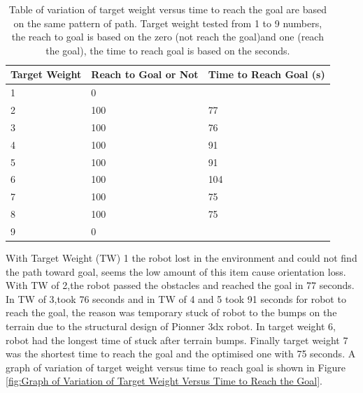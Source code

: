 \begin{table}[ht!]
\centering
    \begin{tabular}{ m{3cm} m{5cm} m{5cm} } 
    \toprule
    \toprule
    \textbf{Target Weight} & \textbf{Reach to Goal or Not} & \textbf{Time to Reach Goal (s)} \\
    \midrule
    1      & 0       &    \\[1.3ex]
    2       & 100    & 77   \\[1.3ex]
    3      & 100     & 76   \\[1.3ex]
    4      & 100     & 91   \\[1.3ex]
    5      & 100    & 91   \\[1.3ex]
    6     & 100     & 104     \\[1.3ex]
    7     & 100     & 75     \\[1.3ex]
    8     & 100     & 75   \\[1.3ex]
    9     & 0       &    \\[1.3ex]
    \bottomrule
    \bottomrule
\end{tabular}
\caption[Variation of Target Weight Versus Time to Reach the Goal]{Table of variation of target weight versus time to reach the goal are based on the same pattern of path. Target weight tested from 1 to 9 numbers, the reach to goal is based on the zero (not reach the goal)and one (reach the goal), the time to reach goal is based on the seconds. }
\label{table:Variation of Target Weight Versus Time to Reach the Goal}
\end{table} 
\noindent With Target Weight (TW) 1 the robot lost in the environment and could not find the path toward goal, seems the low amount of this item cause orientation loss. With TW of 2,the robot passed the obstacles and reached the goal in 77 seconds. In TW of 3,took 76 seconds and in TW of 4 and 5 took 91 seconds for robot to reach the goal, the reason was temporary stuck of robot to the bumps on the terrain due to the structural design of Pionner 3dx robot. In target weight 6, robot had the longest time of stuck after terrain bumps. Finally target weight 7 was the shortest time to reach the goal and the optimised one with 75 seconds. A graph of variation of target weight versus time to reach goal is shown in Figure \ref{fig:Graph of Variation of Target Weight Versus Time to Reach the Goal}. 
